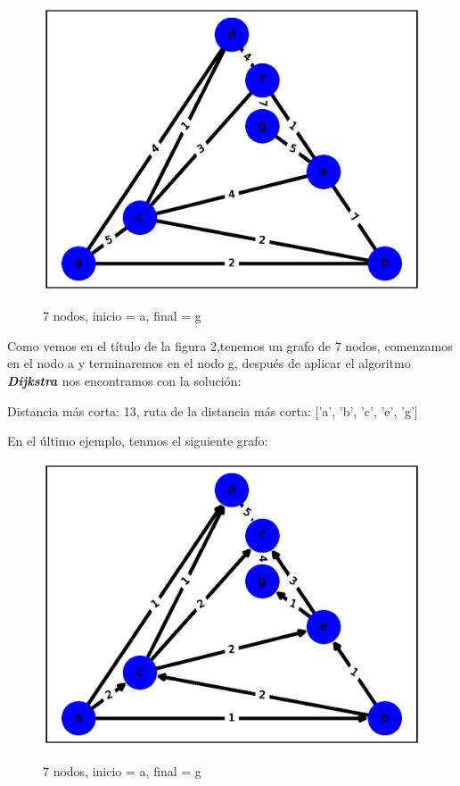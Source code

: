 \documentclass{report}
\newcommand{\dij}{{\bfseries {\textit{Dijkstra }}}}
\begin{document}
\begin{figure}[h!t]
    \centering
    \includegraphics[scale = 0.35]{ejemplo2.eps}
    \label{figura2}
    \caption{7 nodos, inicio = a, final = g}
\end{figure}

Como vemos en el título de la  figura 2,tenemos un grafo de 7 nodos, comenzamos en el nodo a y terminaremos en el nodo g, después de aplicar el algoritmo  \dij nos encontramos con la solución:
\begin{center}
    Distancia más corta:
    13,
    ruta de la distancia más corta:
    ['a', 'b', 'c', 'e', 'g']
\end{center}

En el último ejemplo, tenmos el siguiente grafo:

\begin{figure}[h!t]
    \centering
    \includegraphics[scale = 0.4]{ejemplo3.eps}
    \label{figura3}
    \caption{7 nodos, inicio = a, final = g}
\end{figure}
\end{document}
